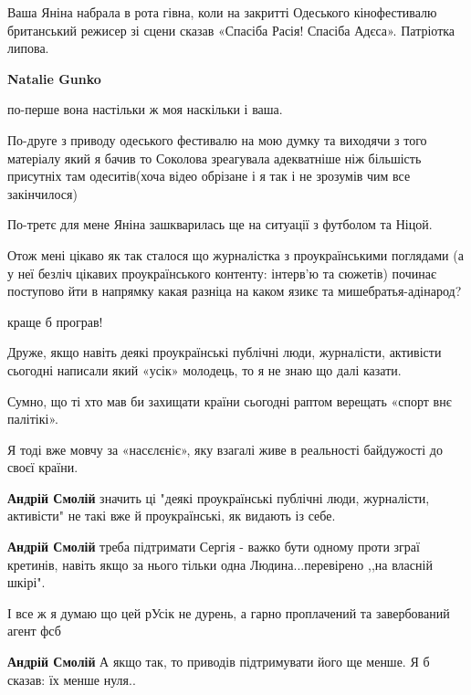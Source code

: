\begin{itemize}
\begin{itemize}
Ваша Яніна набрала в рота гівна, коли на закритті Одеського кінофестивалю
британський режисер зі сцени сказав «Спасіба Расія! Спасіба Адєса». Патріотка
липова.

\textbf{Natalie Gunko} 

по-перше вона настільки ж моя наскільки і ваша.

По-друге з приводу одеського фестивалю на мою думку та виходячи з того
матеріалу який я бачив то Соколова зреагувала адекватніше ніж більшість
присутніх там одеситів(хоча відео обрізане і я так і не зрозумів чим все
закінчилося)

По-третє для мене Яніна зашкварилась ще на ситуації з футболом та Ніцой.

Отож мені цікаво як так сталося що журналістка з проукраїнськими поглядами (а у
неї безліч цікавих проукраїнського контенту: інтерв'ю та сюжетів) починає
поступово йти в напрямку какая разніца на каком язикє та мишебратья-адінарод?

\end{itemize} %

краще б програв!


Друже, якщо навіть деякі проукраїнські публічні люди, журналісти, активісти
сьогодні написали який «усік» молодець, то я не знаю що далі казати.

Сумно, що ті хто мав би захищати країни сьогодні раптом верещать «спорт внє
палітікі».

Я тоді вже мовчу за «насєлєніє», яку взагалі живе в реальності байдужості до
своєї країни.

\begin{itemize} %
\textbf{Андрій Смолій} значить ці "деякі проукраїнські публічні люди, журналісти, активісти" не такі вже й проукраїнські, як видають із себе.

\textbf{Андрій Смолій} треба підтримати Сергія - важко бути одному проти зграї кретинів, навіть якщо за нього тільки одна Людина...перевірено ,,на власній шкірі".
\end{itemize} %


І все ж я думаю що цей рУсік не дурень, а гарно проплачений та завербований агент фсб

\begin{itemize} %
\textbf{Андрій Смолій} А якщо так, то приводів підтримувати його ще менше. Я б сказав: їх менше нуля..


\end{itemize}
\end{itemize}
